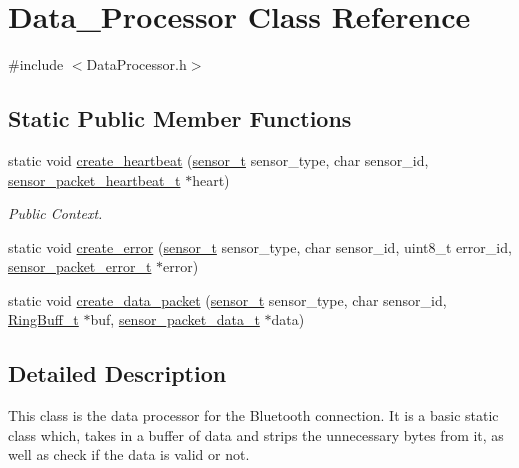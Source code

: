 \hypertarget{class_data___processor}{\section{\-Data\-\_\-\-Processor \-Class \-Reference}
\label{class_data___processor}
}


{\ttfamily \#include $<$\-Data\-Processor.\-h$>$}

\subsection*{\-Static \-Public \-Member \-Functions}
\begin{DoxyCompactItemize}
\item 
static void \hyperlink{class_data___processor_a78e40f429385afd57d38d2c5fab66be2}{create\-\_\-heartbeat} (\hyperlink{_protocol_definition_8h_a7db4018819078870576bf80126e7804d}{sensor\-\_\-t} sensor\-\_\-type, char sensor\-\_\-id, \hyperlink{structsensor__packet__heartbeat__t}{sensor\-\_\-packet\-\_\-heartbeat\-\_\-t} $\ast$heart)
\begin{DoxyCompactList}\small\item\em \-Public \-Context. \end{DoxyCompactList}\item 
static void \hyperlink{class_data___processor_a35079c8a9d8aab08e57c32935ebe7ba4}{create\-\_\-error} (\hyperlink{_protocol_definition_8h_a7db4018819078870576bf80126e7804d}{sensor\-\_\-t} sensor\-\_\-type, char sensor\-\_\-id, uint8\-\_\-t error\-\_\-id, \hyperlink{structsensor__packet__error__t}{sensor\-\_\-packet\-\_\-error\-\_\-t} $\ast$error)
\item 
static void \hyperlink{class_data___processor_a502c865ae3f23558204538ac2fede0bc}{create\-\_\-data\-\_\-packet} (\hyperlink{_protocol_definition_8h_a7db4018819078870576bf80126e7804d}{sensor\-\_\-t} sensor\-\_\-type, char sensor\-\_\-id, \hyperlink{struct_ring_buff__t}{\-Ring\-Buff\-\_\-t} $\ast$buf, \hyperlink{structsensor__packet__data__t}{sensor\-\_\-packet\-\_\-data\-\_\-t} $\ast$data)
\end{DoxyCompactItemize}


\subsection{\-Detailed \-Description}
\-This class is the data processor for the \-Bluetooth connection. \-It is a basic static class which, takes in a buffer of data and strips the unnecessary bytes from it, as well as check if the data is valid or not. 


